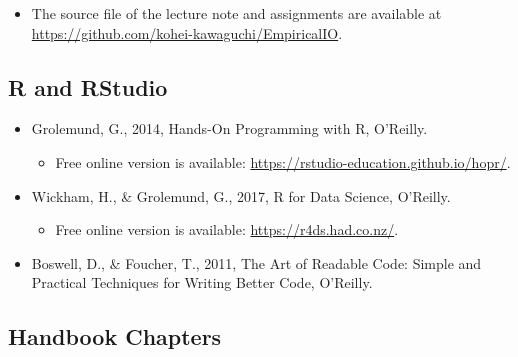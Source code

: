 \documentclass[
]{book}
\providecommand{\tightlist}{%
  \setlength{\itemsep}{0pt}\setlength{\parskip}{0pt}}
\begin{document}
\begin{itemize}
\tightlist
\item
  The source file of the lecture note and assignments are available at \url{https://github.com/kohei-kawaguchi/EmpiricalIO}.
\end{itemize}

\hypertarget{r-and-rstudio}{%
\subsection{R and RStudio}\label{r-and-rstudio}}

\begin{itemize}
\tightlist
\item
  Grolemund, G., 2014, Hands-On Programming with R, O'Reilly.

  \begin{itemize}
  \tightlist
  \item
    Free online version is available: \url{https://rstudio-education.github.io/hopr/}.
  \end{itemize}
\item
  Wickham, H., \& Grolemund, G., 2017, R for Data Science, O'Reilly.

  \begin{itemize}
  \tightlist
  \item
    Free online version is available: \url{https://r4ds.had.co.nz/}.
  \end{itemize}
\item
  Boswell, D., \& Foucher, T., 2011, The Art of Readable Code: Simple and Practical Techniques for Writing Better Code, O'Reilly.
\end{itemize}

\hypertarget{handbook-chapters}{%
\subsection{Handbook Chapters}\label{handbook-chapters}}
\end{document}
